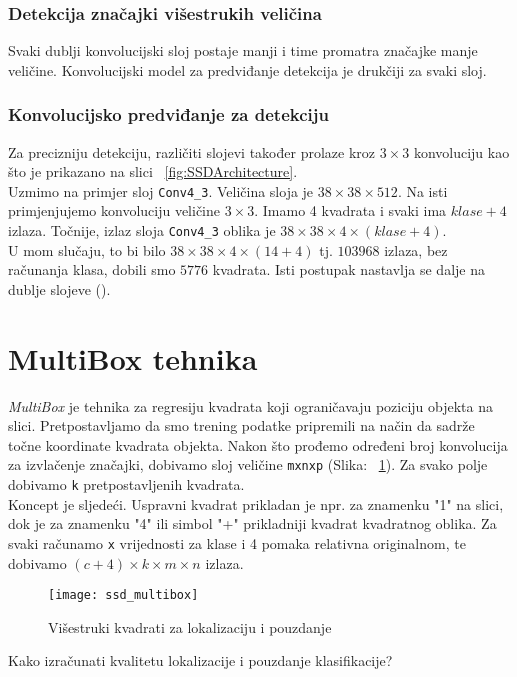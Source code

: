 \subsubsection{Detekcija značajki višestrukih veličina}
Svaki dublji konvolucijski sloj postaje manji i time promatra značajke manje veličine.
Konvolucijski model za predviđanje detekcija je drukčiji za svaki sloj.

\subsubsection{Konvolucijsko predviđanje za detekciju}
Za precizniju detekciju, različiti slojevi također prolaze kroz $3\times3$ konvoluciju kao što je prikazano na slici ~\ref{fig:SSDArchitecture}. \\
Uzmimo na primjer sloj \texttt{Conv4\_3}.
Veličina sloja je $38\times38\times512$. 
Na isti primjenjujemo konvoluciju veličine $3\times3$.
Imamo 4 kvadrata i svaki ima $klase + 4$ izlaza.
Točnije, izlaz sloja \texttt{Conv4\_3} oblika je $38\times38\times4\times(klase + 4)$. \\
U mom slučaju, to bi bilo $38\times38\times4\times(14 + 4)$ tj. $103968$ izlaza, bez računanja klasa, dobili smo $5776$ kvadrata.
Isti postupak nastavlja se dalje na dublje slojeve (\cite{ssd2}).

\section{MultiBox tehnika}
\emph{MultiBox} je tehnika za regresiju kvadrata koji ograničavaju poziciju objekta na slici.
Pretpostavljamo da smo trening podatke pripremili na način da sadrže točne koordinate kvadrata objekta.
Nakon što prođemo određeni broj konvolucija za izvlačenje značajki, dobivamo sloj veličine \texttt{mxnxp} (Slika: ~\ref{fig:SSDMultiBox}).
Za svako polje dobivamo \texttt{k} pretpostavljenih kvadrata. \\
Koncept je sljedeći. 
Uspravni kvadrat prikladan je npr. za znamenku "1" na slici, dok je za znamenku "4" ili simbol "+" prikladniji kvadrat kvadratnog oblika.
Za svaki računamo \texttt{x} vrijednosti za klase i 4 pomaka relativna originalnom, te dobivamo $(c + 4)\times k \times m \times n$ izlaza.
\begin{figure}[h!]
	\centering
	\texttt{[image: ssd\_multibox]}
	 \caption{Višestruki kvadrati za lokalizaciju i pouzdanje}
 	 \label{fig:SSDMultiBox}
\end{figure}
Kako izračunati kvalitetu lokalizacije i pouzdanje klasifikacije? \\
